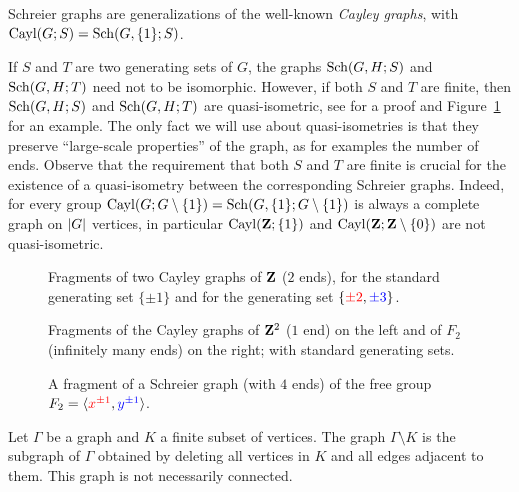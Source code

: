 Schreier graphs are generalizations of the well-known \emph{Cayley graphs}, with $\operatorname{Cayl}(G;S)=\operatorname{Sch}(G,\{1\};S)$.

If $S$ and $T$ are two generating sets of $G$, the graphs $\operatorname{Sch}(G,H;S)$ and $\operatorname{Sch}(G,H;T)$ need not to be isomorphic. However, if both $S$ and $T$ are finite, then $\operatorname{Sch}(G,H;S)$ and $\operatorname{Sch}(G,H;T)$ are quasi-isometric, see \cite[IV.B.21.iii]{DelaHarpe2000} for a proof and Figure~\ref{Figure:CayleyOfZ} for an example. The only fact we will use about quasi-isometries is that they preserve ``large-scale properties'' of the graph, as for examples the number of ends.
Observe that the requirement that both $S$ and $T$ are finite is crucial for the existence of a quasi-isometry between the corresponding Schreier graphs. Indeed, for every group  $\operatorname{Cayl}(G;G\setminus\{1\})=\operatorname{Sch}(G,\{1\};G\setminus\{1\})$ is always a complete graph on $\lvert G\rvert$ vertices, in particular  $\operatorname{Cayl}(\mathbf{Z};\{1\})$ and $\operatorname{Cayl}(\mathbf{Z};\mathbf{Z}\setminus\{0\})$ are not quasi-isometric.
%
%
\begin{figure}[htbp]\centering

\caption{Fragments of two Cayley graphs of $\mathbf{Z}$ ($2$ ends), for the standard generating set $\{\pm1\}$ and for the generating set $\{\textcolor{red}{\pm2},\textcolor{blue}{\pm3}\}$.}
\label{Figure:CayleyOfZ}
\end{figure}
\begin{figure}[htbp]\centering
\begin{subfigure}{0.5\textwidth}
\centering

\end{subfigure}%
\begin{subfigure}{0.5\textwidth}
\centering
\scalebox{0.8}{}
\end{subfigure}
\caption{Fragments of the Cayley graphs of $\mathbf{Z}^2$ ($1$ end) on the left and of $F_2$ (infinitely many ends) on the right; with standard generating sets.}
\label{Figure:CayleyOfZ2}
\end{figure}
\begin{figure}[htbp]\centering

\caption{A fragment of a Schreier graph (with $4$ ends) of the free group $F_2=\langle \textcolor{red}{x^{\pm1}},\textcolor{blue}{y^{\pm1}}\rangle$.}
\label{Figure:SchreierOfF2}
\end{figure}
%
%
Let $\Gamma$ be a graph and $K$ a finite subset of vertices. The graph $\Gamma\setminus K$ is the subgraph of $\Gamma$ obtained by deleting all vertices in $K$ and all edges adjacent to them. This graph is not necessarily connected.

